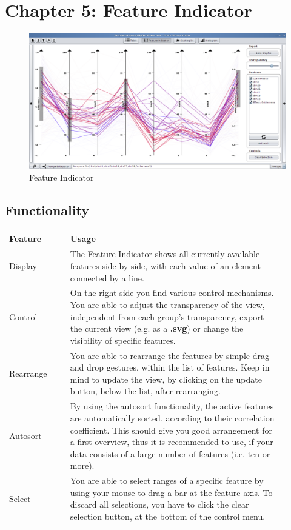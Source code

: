 
\section{\color{fancy}Chapter 5: Feature Indicator}

\begin{figure}[h]
  \centering
  \includegraphics[width=16cm]{images/bsv/FeatureIndicator.png}
  \caption{Feature Indicator}
  \label{fig:featureindicator}
\end{figure}

\subsection{Functionality}
\begin{tabular}{p{0.2\linewidth}p{0.7\linewidth}}
  \color{fancy}Feature & \color{fancy}Usage \\ \hline
  Display & The Feature Indicator shows all currently available features side by side, with each value of an element connected by a line.  \\ \hline
  Control & On the right side you find various control mechanisms. You are able to adjust the transparency of the view, independent from each group's transparency, export the current view (e.g. as a \textbf{.svg}) or change the visibility of specific features. \\ \hline
  Rearrange &  You are able to rearrange the features by simple drag and drop gestures, within the list of features. Keep in mind to update the view, by clicking on the update button, below the list, after rearranging.\\ \hline
  Autosort &  By using the autosort functionality, the active features are automatically sorted, according to their correlation coefficient. This should give you good arrangement for a first overview, thus it is recommended to use, if your data consists of a large number of features (i.e. ten or more).  \\ \hline
  Select & You are able to select ranges of a specific feature by using your mouse to drag a bar at the feature axis. To discard all selections, you have to click the clear selection button, at the bottom of the control menu. \\ \hline
\end{tabular}

